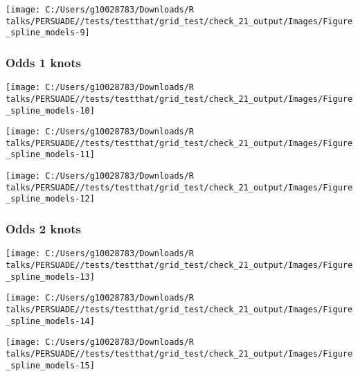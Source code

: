 \documentclass[
]{article}
\begin{document}
\begin{flushleft}\texttt{[image: C:/Users/g10028783/Downloads/R talks/PERSUADE//tests/testthat/grid\_test/check\_21\_output/Images/Figure\_spline\_models-9]} \end{flushleft}

\clearpage

\subsubsection{Odds 1 knots}\label{odds-1-knots}

\begin{flushleft}\texttt{[image: C:/Users/g10028783/Downloads/R talks/PERSUADE//tests/testthat/grid\_test/check\_21\_output/Images/Figure\_spline\_models-10]} \end{flushleft}

\begin{flushleft}\texttt{[image: C:/Users/g10028783/Downloads/R talks/PERSUADE//tests/testthat/grid\_test/check\_21\_output/Images/Figure\_spline\_models-11]} \end{flushleft}

\begin{flushleft}\texttt{[image: C:/Users/g10028783/Downloads/R talks/PERSUADE//tests/testthat/grid\_test/check\_21\_output/Images/Figure\_spline\_models-12]} \end{flushleft}

\clearpage

\subsubsection{Odds 2 knots}\label{odds-2-knots}

\begin{flushleft}\texttt{[image: C:/Users/g10028783/Downloads/R talks/PERSUADE//tests/testthat/grid\_test/check\_21\_output/Images/Figure\_spline\_models-13]} \end{flushleft}

\begin{flushleft}\texttt{[image: C:/Users/g10028783/Downloads/R talks/PERSUADE//tests/testthat/grid\_test/check\_21\_output/Images/Figure\_spline\_models-14]} \end{flushleft}

\begin{flushleft}\texttt{[image: C:/Users/g10028783/Downloads/R talks/PERSUADE//tests/testthat/grid\_test/check\_21\_output/Images/Figure\_spline\_models-15]} \end{flushleft}
\end{document}
